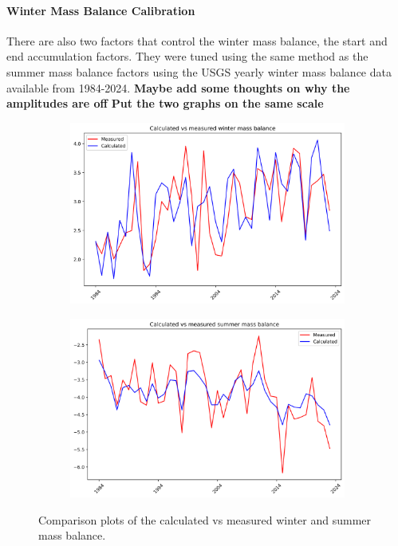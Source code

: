 \documentclass{article}
\begin{document}
\paragraph{Winter Mass Balance Calibration}
There are also two factors that control the winter mass balance, the start and end accumulation factors. They were tuned using the same 
method as the summer mass balance factors using the USGS yearly winter mass balance data available from 1984-2024.
\textbf{Maybe add some thoughts on why the amplitudes are off}
\textbf{Put the two graphs on the same scale}
\begin{figure}[h]
    \centering
    \begin{subfigure}[b]{0.49\textwidth}
        \centering
        \includegraphics[width=\textwidth]{Plots/winter_mb_compare.png}
        \label{fig:winter_mb_compare}
    \end{subfigure}
    \hfill
    \begin{subfigure}[b]{0.49\textwidth}
        \centering
        \includegraphics[width=\textwidth]{Plots/summer_mb_compare.png}
        \label{fig:summer_mb_compare}
    \end{subfigure}
    \caption{Comparison plots of the calculated vs measured winter and summer mass balance.}
    \label{fig:mb_comparison}
\end{figure}
\FloatBarrier
\end{document}
